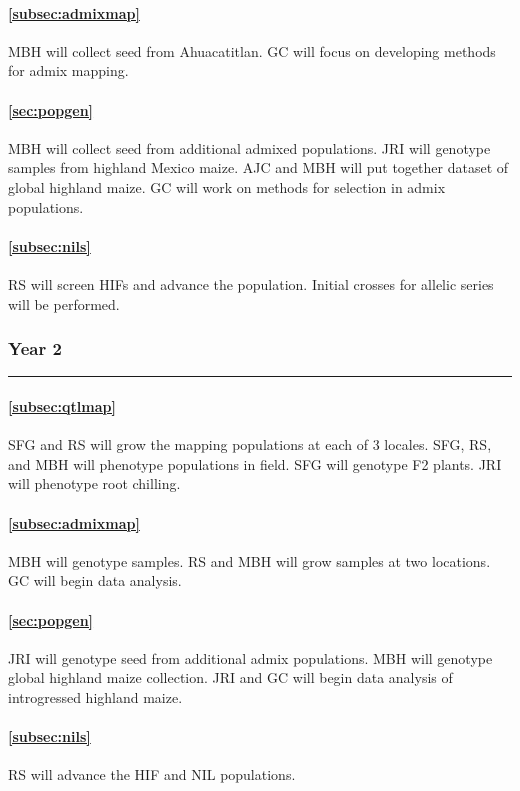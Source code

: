 \paragraph{  \bf  \ref{subsec:admixmap}} MBH will collect seed from Ahuacatitlan. GC will focus on developing methods for admix mapping.
\paragraph{  \bf  \ref{sec:popgen}} MBH will collect seed from additional admixed populations. JRI will genotype samples from highland Mexico maize. AJC and MBH will put together dataset of global highland maize. GC will work on methods for selection in admix populations.
\paragraph{ \bf \ref{subsec:nils}} RS will screen HIFs and advance the population. Initial crosses for allelic series will be performed.

\subsubsection*{Year 2} \hrule \vspace{0.1cm}

\paragraph{  \bf \ref{subsec:qtlmap}} SFG and RS will grow the mapping populations at each of 3 locales.  SFG, RS, and MBH will phenotype populations in field. SFG will genotype F2 plants. JRI will phenotype root chilling. 
\paragraph{  \bf  \ref{subsec:admixmap}} MBH will genotype samples.  RS and MBH will grow samples at two locations.  GC will begin data analysis.
\paragraph{  \bf  \ref{sec:popgen}} JRI will genotype seed from additional admix populations. MBH will genotype global highland maize collection. JRI and GC will begin data analysis of introgressed highland maize.
\paragraph{ \bf \ref{subsec:nils}} RS will advance the HIF and NIL populations.  
